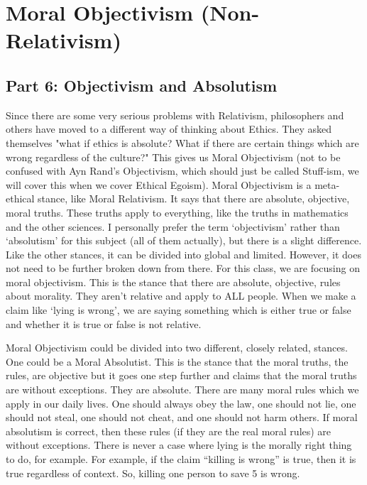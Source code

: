\part{Moral Objectivism (Non-Relativism)}
\label{ch.mod2}
\chapter{Part 6: Objectivism and Absolutism}
Since there are some very serious problems with Relativism, philosophers and others have moved to a different way of thinking about Ethics. They asked themselves "what if ethics is absolute? What if there are certain things which are wrong regardless of the culture?" This gives us Moral Objectivism (not to be confused with Ayn Rand's Objectivism, which should just be called Stuff-ism, we will cover this when we cover Ethical Egoism). Moral Objectivism is a meta-ethical stance, like Moral Relativism. It says that there are absolute, objective, moral truths. These truths apply to everything, like the truths in mathematics and the other sciences.  I personally prefer the term ‘objectivism’ rather than ‘absolutism’ for this subject (all of them actually), but there is a slight difference. Like the other stances, it can be divided into global and limited. However, it does not need to be further broken down from there. For this class, we are focusing on moral objectivism. This is the stance that there are absolute, objective, rules about morality. They aren’t relative and apply to ALL people. When we make a claim like ‘lying is wrong’, we are saying something which is either true or false and whether it is true or false is not relative.

Moral Objectivism could be divided into two different, closely related, stances. One could be a Moral Absolutist. This is the stance that the moral truths, the rules, are objective but it goes one step further and claims that the moral truths are without exceptions. They are absolute. There are many moral rules which we apply in our daily lives. One should always obey the law, one should not lie, one should not steal, one should not cheat, and one should not harm others. If moral absolutism is correct, then these rules (if they are the real moral rules) are without exceptions. There is never a case where lying is the morally right thing to do, for example. For example, if the claim “killing is wrong” is true, then it is true regardless of context. So, killing one person to save 5 is wrong. 

